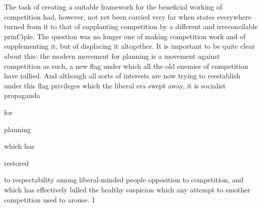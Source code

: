\documentclass[11pt,openany]{book}
\begin{document}
\begin{center}\textasteriskcentered\hspace{0.9em}\textasteriskcentered\hspace{0.9em}\textasteriskcentered\end{center}

The task of creating a suitable framework for the beneficial working of competition had, however, not yet been carried very far when states everywhere turned from it to that of supplanting competition by a different and irreconcilable prinCiple. The question was no longer one of making competition work and of supplementing it, but of displacing it altogether. It is important to be quite clear about this: the modern movement for planning is a movement against competition as such, a new flag under which all the old enemies of competition have rallied. And although all sorts of interests are now trying to reestablish under this flag privileges which the liberal era swept away, it is socialist propaganda

for

planning

which has

restored

to respectability among liberal-minded people opposition to competition, and which has effectively lulled the healthy suspicion which any attempt to smother competition used to arouse. 1
\end{document}
